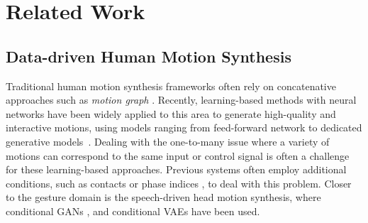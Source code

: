 \section{Related Work}
\label{sec:related_work}

\subsection{Data-driven Human Motion Synthesis}
Traditional human motion synthesis frameworks often rely on concatenative approaches such as \emph{motion graph} \cite{Kovar2002_MotionGraphs}. Recently, learning-based methods with neural networks have been widely applied to this area to generate high-quality and interactive motions, using models ranging from feed-forward network \cite{holden2017phase,Starke2022_DeepPhase} to dedicated generative models~\cite{henter2020moglow, Ling2020_MotionVAE}. Dealing with the one-to-many issue where a variety of motions can correspond to the same input or control signal is often a challenge for these learning-based approaches. Previous systems often employ additional conditions, such as contacts \cite{starke2020local} or phase indices \cite{holden2017phase,Starke2022_DeepPhase}, to deal with this problem. Closer to the gesture domain is the speech-driven head motion synthesis, where conditional GANs \cite{sadoughi2018novel}, and conditional VAEs \cite{greenwood2017predicting} have been used.

